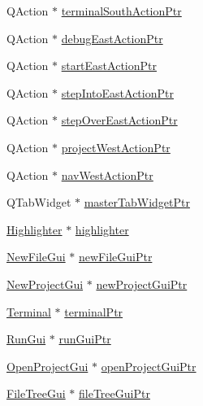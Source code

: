 \begin{DoxyCompactItemize}
\item 
Q\-Action $\ast$ \hyperlink{class_master_actions_ad96c9f17230e162e9a9f39a867101a53}{terminal\-South\-Action\-Ptr}
\item 
Q\-Action $\ast$ \hyperlink{class_master_actions_ab26f3e610cb9e303ac3a987964dfac19}{debug\-East\-Action\-Ptr}
\item 
Q\-Action $\ast$ \hyperlink{class_master_actions_a8ea0090704403ea15decad4e0104feb8}{start\-East\-Action\-Ptr}
\item 
Q\-Action $\ast$ \hyperlink{class_master_actions_acc473f35c8ee83c1d2d10d3a73522461}{step\-Into\-East\-Action\-Ptr}
\item 
Q\-Action $\ast$ \hyperlink{class_master_actions_a2c51444dbd1ff60d23dd52cc6fb4a9f7}{step\-Over\-East\-Action\-Ptr}
\item 
Q\-Action $\ast$ \hyperlink{class_master_actions_aa4160469d2e9a840448c49e95bcfa9e5}{project\-West\-Action\-Ptr}
\item 
Q\-Action $\ast$ \hyperlink{class_master_actions_af1e3c333e90f4763dfd964aa2321b034}{nav\-West\-Action\-Ptr}
\item 
Q\-Tab\-Widget $\ast$ \hyperlink{class_master_actions_a774ef398053050c37d62b7a24e61c7ee}{master\-Tab\-Widget\-Ptr}
\item 
\hyperlink{class_highlighter}{Highlighter} $\ast$ \hyperlink{class_master_actions_a50b1565db8b7780ec4e88e59953aa67b}{highlighter}
\item 
\hyperlink{class_new_file_gui}{New\-File\-Gui} $\ast$ \hyperlink{class_master_actions_a8839c174acf071c0d9bfe450160218eb}{new\-File\-Gui\-Ptr}
\item 
\hyperlink{class_new_project_gui}{New\-Project\-Gui} $\ast$ \hyperlink{class_master_actions_a78733336a3d5fd3bbb55eaf0215f0d40}{new\-Project\-Gui\-Ptr}
\item 
\hyperlink{class_terminal}{Terminal} $\ast$ \hyperlink{class_master_actions_accb886e749ad46cb6373187e59921bcf}{terminal\-Ptr}
\item 
\hyperlink{class_run_gui}{Run\-Gui} $\ast$ \hyperlink{class_master_actions_ad7ff295f2e3067697e290afc4f0fd0df}{run\-Gui\-Ptr}
\item 
\hyperlink{class_open_project_gui}{Open\-Project\-Gui} $\ast$ \hyperlink{class_master_actions_a6caf7325dd9cb26f72c81a8c877db634}{open\-Project\-Gui\-Ptr}
\item 
\hyperlink{class_file_tree_gui}{File\-Tree\-Gui} $\ast$ \hyperlink{class_master_actions_a53d5e999ea25b0d3d1643fca709f3bcb}{file\-Tree\-Gui\-Ptr}
\end{DoxyCompactItemize}


